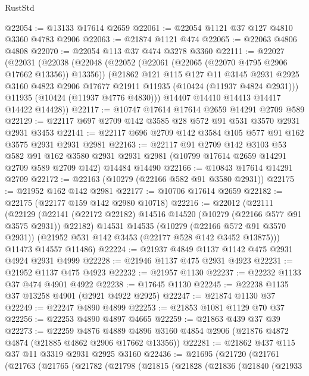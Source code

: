 \begin{lexlean}{RustStd}
\begin{coremodule}
@22054 := @13133 @17614 @2659
@22061 := @22054 @1121 @37 @127 @4810 @3360 @4783 @2906
@22063 := @21874 @1121 @474
@22065 := @22063 @4806 @4808
@22070 := @22054 @113 @37 @474 @3278 @3360
@22111 := @22027
    (@22031
      (@22038
        (@22048
          (@22052 (@22061 (@22065 (@22070 @4795 @2906 @17662 @13356)) @13356))
          (@21862
            @121
            @115
            @127
            @11
            @3145
            @2931
            @2925
            @3160
            @4823
            @2906
            @17677
            @21911
            @11935
            (@10424 (@11937 @4824 @2931)))
          @11935
          (@10424 (@11937 @4776 @4830)))
        @14407
        @14410
        @14413
        @14417
        @14422
        @14428))
@22117 := @10747 @17614 @17614 @2659 @14291 @2709 @589
@22129 := @22117 @697 @2709 @142 @3585 @28 @572 @91 @531 @3570 @2931 @2931 @3453
@22141 := @22117 @696 @2709 @142 @3584 @105 @577 @91 @162 @3575 @2931 @2931 @2981
@22163 := @22117
    @91
    @2709
    @142
    @3103
    @53
    @582
    @91
    @162
    @3580
    @2931
    @2931
    @2981
    (@10799 @17614 @2659 @14291 @2709 @589 @2709 @142)
    @14484
    @14490
@22166 := @10843 @17614 @14291 @2709
@22172 := @22163 (@10279 (@22166 @582 @91 @3580 @2931))
@22175 := @21952 @162 @142 @2981
@22177 := @10706 @17614 @2659
@22182 := @22175 (@22177 @159 @142 @2980 @10718)
@22216 := @22012
    (@22111
      (@22129
        (@22141 (@22172 @22182) @14516 @14520 (@10279 (@22166 @577 @91 @3575 @2931)) @22182)
        @14531
        @14535
        (@10279 (@22166 @572 @91 @3570 @2931))
        (@21952 @531 @142 @3453 (@22177 @528 @142 @3452 @13875)))
      @11473
      @14557
      @11486)
@22224 := @21937 @4849 @1137 @1142 @475 @2931 @4924 @2931 @4999
@22228 := @21946 @1137 @475 @2931 @4923
@22231 := @21952 @1137 @475 @4923
@22232 := @21957 @1130
@22237 := @22232 @1133 @37 @474 @4901 @4922
@22238 := @17645 @1130
@22245 := @22238 @1135 @37 @13258 @4901 (@2921 @4922 @2925)
@22247 := @21874 @1130 @37
@22249 := @22247 @4890 @4899
@22253 := @21853 @1081 @1129 @70 @37
@22256 := @22253 @4890 @4897 @4665
@22259 := @21863 @439 @37 @39
@22273 := @22259
    @4876
    @4889
    @4896
    @3160
    @4854
    @2906
    (@21876 @4872 @4874 (@21885 @4862 @2906 @17662 @13356))
@22281 := @21862 @437 @115 @37 @11 @3319 @2931 @2925 @3160
@22436 := @21695
    (@21720
      (@21761
        (@21763
          (@21765
            (@21782
              (@21798
                (@21815
                  (@21828
                    (@21836
                      (@21840
                        (@21933

\end{coremodule}
\end{lexlean}
